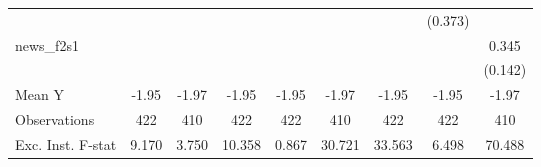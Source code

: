 {\begin{tabular}{l*{8}{c}}
            &                     &                     &                     &                     &                     &                     &     (0.373)         &                     \\
\addlinespace
news\_f2s1   &                     &                     &                     &                     &                     &                     &                     &       0.345\sym{**} \\
            &                     &                     &                     &                     &                     &                     &                     &     (0.142)         \\
\midrule
Mean Y      &       -1.95         &       -1.97         &       -1.95         &       -1.95         &       -1.97         &       -1.95         &       -1.95         &       -1.97         \\
Observations&         422         &         410         &         422         &         422         &         410         &         422         &         422         &         410         \\
Exc. Inst. F-stat&       9.170         &       3.750         &      10.358         &       0.867         &      30.721         &      33.563         &       6.498         &      70.488         \\
\bottomrule
\end{tabular}
}
